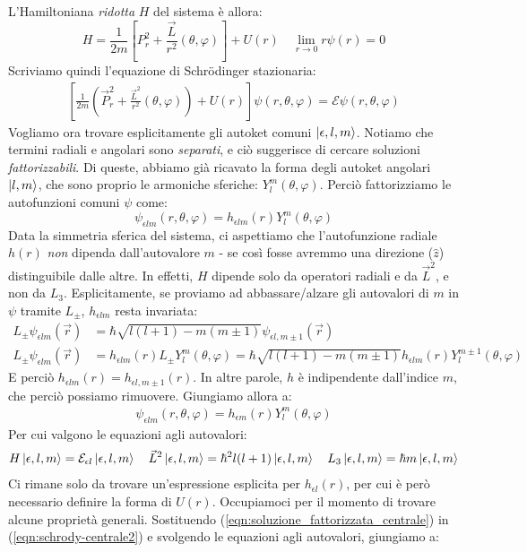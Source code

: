\documentclass[../../FisicaTeorica.tex]{subfiles}
\begin{document}
L'Hamiltoniana \textit{ridotta} $H$ del sistema è allora:
\[
H = \frac{1}{2m}\left[P_r^2  + \frac{\vec{L}}{r^2} (\theta,\varphi)\right]+ U(r)\quad \lim_{r\to 0} r\psi(r) = 0
\]
Scriviamo quindi l'equazione di Schr\"odinger stazionaria:
\begin{align}
\left[\frac{1}{2m}\left(\vec{P}_r^2 + \frac{\vec{L}^2}{r^2}(\theta,\varphi)\right) + U(r)\right] \psi(r,\theta,\varphi) = \mathcal{E}\psi(r,\theta,\varphi)
\label{eqn:schrody-centrale2}
\end{align}
Vogliamo ora trovare esplicitamente gli autoket comuni $\Ket{\epsilon, l, m}$.
Notiamo che termini radiali e angolari sono \textit{separati}, e ciò suggerisce di cercare soluzioni \textit{fattorizzabili}. Di queste, abbiamo già ricavato la forma degli autoket angolari $\Ket{l,m}$, che sono proprio le armoniche sferiche: $Y_l^m(\theta,\varphi)$. Perciò fattorizziamo le autofunzioni comuni $\psi$ come:
\[
\psi_{\epsilon l m}(r,\theta,\varphi) = h_{\epsilon l m}(r) Y^m_l(\theta,\varphi)
\]
Data la simmetria sferica del sistema, ci aspettiamo che l'autofunzione radiale $h(r)$ \textit{non} dipenda dall'autovalore $m$ - se così fosse avremmo una direzione ($\hat{z}$) distinguibile dalle altre. In effetti, $H$ dipende solo da operatori radiali e da $\vec{L}^2$, e non da $L_3$. Esplicitamente, se proviamo ad abbassare/alzare gli autovalori di $m$ in $\psi$ tramite $L_\pm$, $h_{\epsilon lm}$ resta invariata:
\begin{align*}
L_\pm \psi_{\epsilon l m}(\vec{r})&=\hbar \sqrt{l(l+1)-m(m\pm 1)}\psi_{\epsilon l, m\pm 1}(\vec{r})\\
L_\pm \psi_{\epsilon l m}(\vec{r}) &= h_{\epsilon l m}(r)L_\pm Y_l^m(\theta,\varphi)=\hbar \sqrt{l(l+1)-m(m\pm 1)}h_{\epsilon l m}(r) Y_l^{m\pm1}(\theta,\varphi)
\end{align*}
E perciò $h_{\epsilon l m}(r) = h_{\epsilon l, m\pm 1}(r)$. In altre parole, $h$ è indipendente dall'indice $m$, che perciò possiamo rimuovere. Giungiamo allora a:
\begin{align}
\psi_{\epsilon l m}(r,\theta,\varphi)=h_{\epsilon m}(r) Y_l^m(\theta,\varphi)
\label{eqn:soluzione_fattorizzata_centrale}
\end{align}
Per cui valgono le equazioni agli autovalori:
\begin{align*}
H \Ket{\epsilon, l ,m} = \mathcal{E}_{\epsilon l}\Ket{\epsilon, l,m} \quad \vec{L}^2 \Ket{\epsilon, l,m} = \hbar^2 l(l+1) \Ket{\epsilon, l,m} \quad L_3 \Ket{\epsilon,l,m} = \hbar m \Ket{\epsilon,l,m}
\end{align*}
Ci rimane solo da trovare un'espressione esplicita per $h_{\epsilon l}(r)$, per cui è però necessario definire la forma di $U(r)$. Occupiamoci per il momento di trovare alcune proprietà generali. Sostituendo (\ref{eqn:soluzione_fattorizzata_centrale}) in (\ref{eqn:schrody-centrale2}) e svolgendo le equazioni agli autovalori, giungiamo a:
\end{document}
